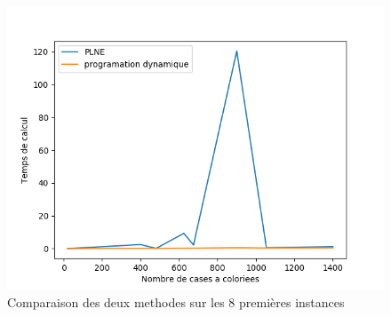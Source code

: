 \documentclass[a4paper]{memoir}
\begin{document}
\begin{figure}[h]
  \centering
  \includegraphics[width=0.75\linewidth]{../graphes/comparaison.png}
  \caption{Comparaison des deux methodes sur les 8 premières instances}
  \label{fig:graphes-comparaison}
\end{figure}
\end{document}
